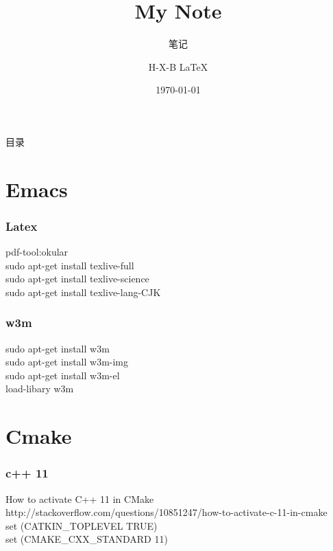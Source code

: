 \documentclass{beamer}
\begin{document}
\begin{CJK}{UTF8}{gkai}   %

    \title{My Note}
    \subtitle{笔记}
    \author{H-X-B \LaTeX{} }
    \date{\today}

    \frame{\titlepage}

    \begin{frame}{目录}
        \tableofcontents
    \end{frame}

    \section{Emacs}

    \begin{frame}\frametitle{Latex}
        pdf-tool:okular\\
        sudo apt-get install texlive-full\\
        sudo apt-get install texlive-science\\
        sudo apt-get install texlive-lang-CJK\\
    \end{frame}

    \begin{frame}\frametitle{w3m}
        sudo apt-get install w3m\\
        sudo apt-get install w3m-img\\
        sudo apt-get install w3m-el\\
        load-libary w3m\\
    \end{frame}

    \section{Cmake}

    \begin{frame}\frametitle{c++ 11}
        How to activate C++ 11 in CMake \\
        http://stackoverflow.com/questions/10851247/how-to-activate-c-11-in-cmake\\
        set (CATKIN\_TOPLEVEL TRUE)\\
        set (CMAKE\_CXX\_STANDARD 11)\\
    \end{frame}


\end{CJK}
\end{document}
